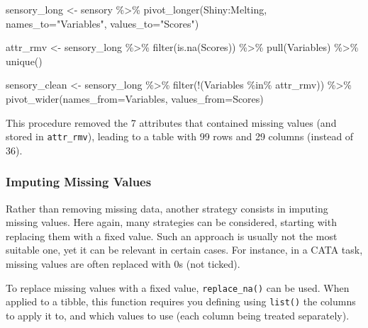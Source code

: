 \documentclass[
]{krantz}
\makeatletter
\newenvironment{Shaded}{\begin{snugshade}}{\end{snugshade}}
\newcommand{\AttributeTok}[1]{\textcolor[rgb]{0.61,0.61,0.61}{#1}}
\newcommand{\FunctionTok}[1]{\textcolor[rgb]{0,0,0}{#1}}
\newcommand{\NormalTok}[1]{#1}
\newcommand{\OtherTok}[1]{\textcolor[rgb]{0.37,0.37,0.37}{#1}}
\newcommand{\SpecialCharTok}[1]{\textcolor[rgb]{0,0,0}{#1}}
\newcommand{\StringTok}[1]{\textcolor[rgb]{0.5,0.5,0.5}{#1}}
\newenvironment{kframe}{%
\medskip{}
\setlength{\fboxsep}{.8em}
 \def\at@end@of@kframe{}%
 \ifinner\ifhmode%
  \def\at@end@of@kframe{\end{minipage}}%
  \begin{minipage}{\columnwidth}%
 \fi\fi%
 \def\FrameCommand##1{\hskip\@totalleftmargin \hskip-\fboxsep
 \colorbox{shadecolor}{##1}\hskip-\fboxsep
     \hskip-\linewidth \hskip-\@totalleftmargin \hskip\columnwidth}%
 \MakeFramed {\advance\hsize-\width
   \@totalleftmargin\z@ \linewidth\hsize
   \@setminipage}}%
 {\par\unskip\endMakeFramed%
 \at@end@of@kframe}
\renewenvironment{Shaded}{\begin{kframe}}{\end{kframe}}
\makeatother
\begin{document}
\begin{Shaded}
\begin{Highlighting}[]
\NormalTok{sensory\_long }\OtherTok{\textless{}{-}}\NormalTok{ sensory }\SpecialCharTok{\%\textgreater{}\%} 
  \FunctionTok{pivot\_longer}\NormalTok{(Shiny}\SpecialCharTok{:}\NormalTok{Melting, }
               \AttributeTok{names\_to=}\StringTok{"Variables"}\NormalTok{, }\AttributeTok{values\_to=}\StringTok{"Scores"}\NormalTok{)}

\NormalTok{attr\_rmv }\OtherTok{\textless{}{-}}\NormalTok{ sensory\_long }\SpecialCharTok{\%\textgreater{}\%} 
  \FunctionTok{filter}\NormalTok{(}\FunctionTok{is.na}\NormalTok{(Scores)) }\SpecialCharTok{\%\textgreater{}\%} 
  \FunctionTok{pull}\NormalTok{(Variables) }\SpecialCharTok{\%\textgreater{}\%} 
  \FunctionTok{unique}\NormalTok{()}

\NormalTok{sensory\_clean }\OtherTok{\textless{}{-}}\NormalTok{ sensory\_long }\SpecialCharTok{\%\textgreater{}\%} 
  \FunctionTok{filter}\NormalTok{(}\SpecialCharTok{!}\NormalTok{(Variables }\SpecialCharTok{\%in\%}\NormalTok{ attr\_rmv)) }\SpecialCharTok{\%\textgreater{}\%} 
  \FunctionTok{pivot\_wider}\NormalTok{(}\AttributeTok{names\_from=}\NormalTok{Variables, }\AttributeTok{values\_from=}\NormalTok{Scores)}
\end{Highlighting}
\end{Shaded}

This procedure removed the 7 attributes that contained missing values (and stored in \texttt{attr\_rmv}), leading to a table with 99 rows and 29 columns (instead of 36).

\hypertarget{imputing-missing-values}{%
\subsubsection*{Imputing Missing Values}\label{imputing-missing-values}}


Rather than removing missing data, another strategy consists in imputing missing values. Here again, many strategies can be considered, starting with replacing them with a fixed value. Such an approach is usually not the most suitable one, yet it can be relevant in certain cases. For instance, in a CATA task, missing values are often replaced with 0s (not ticked).

To replace missing values with a fixed value, \texttt{replace\_na()} can be used. When applied to a tibble, this function requires you defining using \texttt{list()} the columns to apply it to, and which values to use (each column being treated separately).
\end{document}
